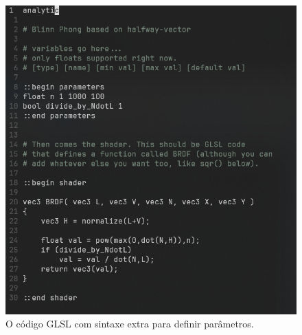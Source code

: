 \begin{figure}[h]
        \caption{\label{fig-disney-code} \small O código GLSL com sintaxe extra para definir parâmetros.}
        \begin{center}
            \includegraphics[scale=0.7]{./Imagens/disney-brdf-code.png}
        \end{center}
\end{figure}



